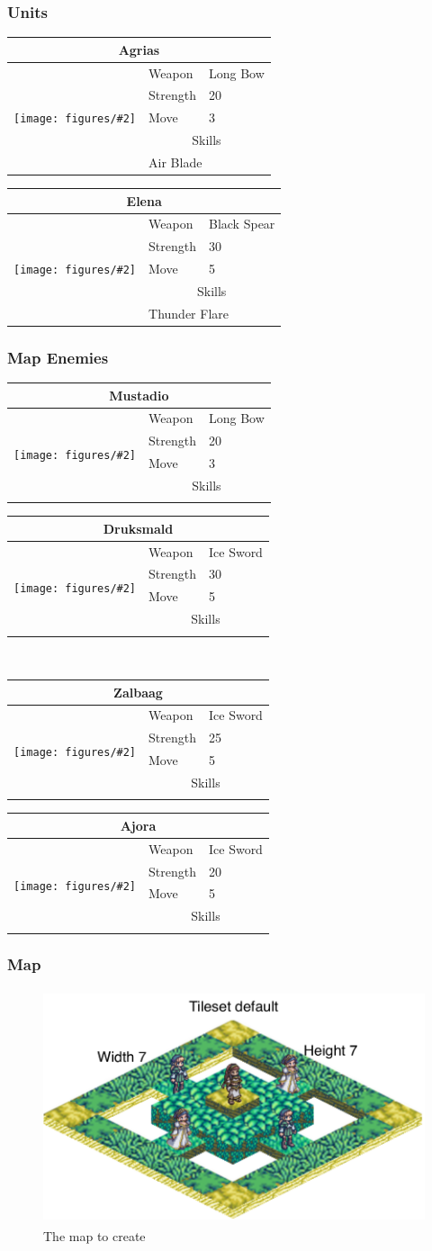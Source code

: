 \newcommand{\unit}[7]{\begin{tabular}{|p{1cm}|lp{2cm}|}
\hline
\multicolumn{3}{|c|}{#1} \\
\hline
\multirow{6}{*}{\texttt{[image: figures/\#2]}} 
 & Weapon    & #3 \\
 & Strength  & #4 \\
 & Move      & #5 \\
 \cline{2-3}
 & \multicolumn{2}{c|}{Skills} \\
 \cline{2-3}
 \ifstrempty{#6}{}{\foreach{\unitSkill}{}{#6}}
 & \multicolumn{2}{l|}{#7}\\
\hline
\end{tabular}
}

\newcommand\unitSkill[2]{
	& \multicolumn{2}{l|}{#2}\\
}
\subsubsection*{Units}
\unit{Agrias}{unit1.png}{Long Bow}{20}{3}{}{Air Blade}
\hspace{0.5cm}
\unit{Elena}{unit4.png}{Black Spear}{30}{5}{}{Thunder Flare}

\subsubsection*{Map Enemies}
\unit{Mustadio}{unit2.png}{Long Bow}{20}{3}{}{}
\hspace{0.5cm}
\unit{Druksmald}{unit3.png}{Ice Sword}{30}{5}{}{}
\\[0.5cm]
\unit{Zalbaag}{unit3.png}{Ice Sword}{25}{5}{}{}
\hspace{0.5cm}
\unit{Ajora}{unit3.png}{Ice Sword}{20}{5}{}{}


\clearpage
\subsubsection*{Map}
\begin{figure}[h!]
	\centering
		\includegraphics[height=2.7in]{figures/Task.pdf}
	\caption{The map to create}
	\label{fig:figures_Task}
\end{figure}


